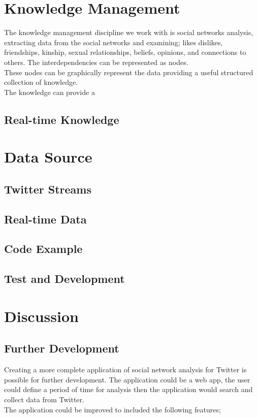 \documentclass[]{article}  %
\begin{document}
\section{Knowledge Management}
The knowledge management discipline we work with is social networks analysis, extracting data from the social networks and examining; likes dislikes, friendships, kinship, sexual relationships, beliefs, opinions, and connections to others. The interdependencies can be represented as nodes. \\ These nodes can be graphically represent the data providing a useful structured collection of knowledge. \\  The knowledge can provide a 

\subsection{Real-time Knowledge}

\section{Data Source}
\subsection{Twitter Streams}
\subsection{Real-time Data}
\subsection{Code Example}
\subsection{Test and Development}
       
\section{Discussion}
\subsection{Further Development}

Creating a more complete application of social network analysis for Twitter is possible for further development. The application could be a web app, the user could define a period of time for analysis then the application would search and collect data from Twitter. \\ The application could be improved to included the following features;
\end{document}
